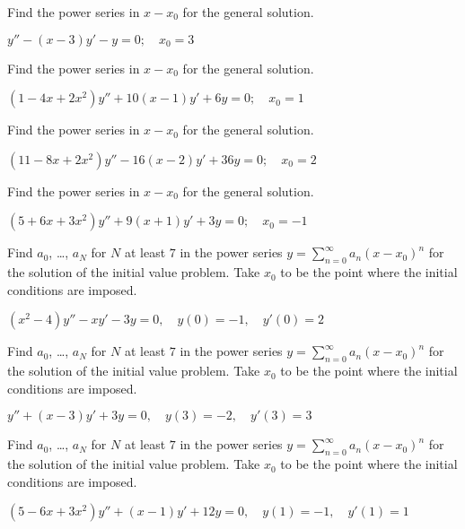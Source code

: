\documentclass{ximera}
\begin{document}
\begin{problem}\label{exer:7.2.17}
Find the power series in $x-x_0$
for the general solution.

$y''-(x-3)y'-y=0;\quad   x_0=3$
\end{problem}

\begin{problem}\label{exer:7.2.18} Find the power series in $x-x_0$
for the general solution.

$(1-4x+2x^2)y''+10(x-1)y'+6y=0;\quad  x_0=1$
\end{problem}

\begin{problem}\label{exer:7.2.19}
Find the power series in $x-x_0$
for the general solution.

$(11-8x+2x^2)y''-16(x-2)y'+36y=0;\quad  x_0=2$
\end{problem}

\begin{problem}\label{exer:7.2.20} 
Find the power series in $x-x_0$
for the general solution.

$(5+6x+3x^2)y''+9(x+1)y'+3y=0;\quad  x_0=-1$
\end{problem}

\begin{problem}\label{exer:7.2.21}  Find $a_0$, \dots, $a_N$ for $N$ at least $7$ in the power series
$y=\sum_{n=0}^\infty a_n(x-x_0)^n$
 for the  solution of the initial value problem.  Take $x_0$ to be the
point where the initial conditions are imposed.

$(x^2-4)y''-xy'-3y=0,\quad y(0)=-1,\quad
y'(0)=2$
\end{problem}

\begin{problem}\label{exer:7.2.22}  Find $a_0$, \dots, $a_N$ for $N$ at least $7$ in the power series
$y=\sum_{n=0}^\infty a_n(x-x_0)^n$
 for the  solution of the initial value problem.  Take $x_0$ to be the
point where the initial conditions are imposed.

$y''+(x-3)y'+3y=0,\quad y(3)=-2,\quad
y'(3)=3$
\end{problem}

\begin{problem}\label{exer:7.2.23}  Find $a_0$, \dots, $a_N$ for $N$ at least $7$ in the power series
$y=\sum_{n=0}^\infty a_n(x-x_0)^n$
 for the  solution of the initial value problem.  Take $x_0$ to be the
point where the initial conditions are imposed.

$(5-6x+3x^2)y''+(x-1)y'+12y=0,\quad
y(1)=-1,\quad y'(1)=1$
\end{problem}
\end{document}
